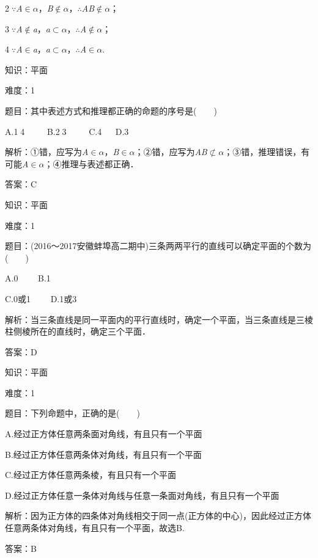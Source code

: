 \documentclass{article} %
\begin{document}
\textcircled{2}$\mathrm{\because}$\textit{A}$\mathrm{\in}$\textit{$\alpha$}，\textit{B}$\mathrm{\notin}$\textit{$\alpha$}，$\mathrm{\therefore}$\textit{AB}$\mathrm{\notin}$\textit{$\alpha$}；

\textcircled{3}$\mathrm{\because}$\textit{A}$\mathrm{\notin}$\textit{a}，\textit{a}$\mathrm{\subset }$\textit{$\alpha$}，$\mathrm{\therefore}$\textit{A}$\mathrm{\notin}$\textit{$\alpha$}；

\textcircled{4}$\mathrm{\because}$\textit{A}$\mathrm{\in}$\textit{a}，\textit{a}$\mathrm{\subset }$\textit{$\alpha$}，$\mathrm{\therefore}$\textit{A}$\mathrm{\in}$\textit{$\alpha$}.

知识：平面

难度：1

题目：其中表述方式和推理都正确的命题的序号是(　　)

A.\textcircled{1}\textcircled{4}　　 B.\textcircled{2}\textcircled{3}　　 C.\textcircled{4}　 D.\textcircled{3}

解析：①错，应写为\textit{A}$\mathrm{\in}$\textit{$\alpha$}，\textit{B}$\mathrm{\in}$\textit{$\alpha$}；②错，应写为\textit{AB}$\mathrm{\nsubset}$\textit{$\alpha$}；③错，推理错误，有可能\textit{A}$\mathrm{\in}$\textit{$\alpha$}；④推理与表述都正确．

答案：C

知识：平面

难度：1

题目：(2016～2017安徽蚌埠高二期中)三条两两平行的直线可以确定平面的个数为(　　)

A.0　　 B.1

C.0或1　　 D.1或3

解析：当三条直线是同一平面内的平行直线时，确定一个平面，当三条直线是三棱柱侧棱所在的直线时，确定三个平面．

答案：D

知识：平面

难度：1

题目：下列命题中，正确的是(　　)

A.经过正方体任意两条面对角线，有且只有一个平面

B.经过正方体任意两条体对角线，有且只有一个平面

C.经过正方体任意两条棱，有且只有一个平面

D.经过正方体任意一条体对角线与任意一条面对角线，有且只有一个平面

解析：因为正方体的四条体对角线相交于同一点(正方体的中心)，因此经过正方体任意两条体对角线，有且只有一个平面，故选B.

答案：B
\end{document}
